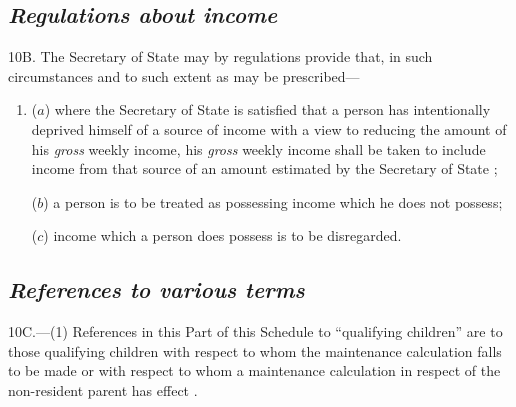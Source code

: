 \documentclass[12pt,a4paper]{article}
\begin{document}

\subsection*{\itshape Regulations about income}

10B. The Secretary of State may by regulations provide that, in such circumstances and to such extent as may be prescribed—
\begin{enumerate}\item[]
($a$) where the 
Secretary of State  %
is satisfied that a person has intentionally deprived himself of a source of income with a view to reducing the amount of his 
\emph{gross}  %
weekly income, his 
\emph{gross}  %
weekly income shall be taken to include income from that source of an amount estimated by the 
Secretary of State%
;

($b$) a person is to be treated as possessing income which he does not possess;

($c$) income which a person does possess is to be disregarded.
\end{enumerate}


\subsection*{\itshape References to various terms}

10C.---(1) References in this Part of this Schedule to “qualifying children” are to those qualifying children with respect to whom the maintenance calculation falls to be made
or with respect to whom a maintenance calculation in respect of the non-resident parent has effect%
.
\end{document}

